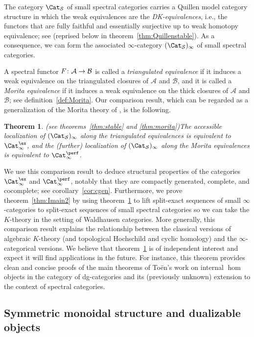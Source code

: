 \documentclass{amsart}
\renewcommand{\to}{\mathchoice{\longrightarrow}{\rightarrow}{\rightarrow}{\rightarrow}}
\let\catsymbfont\mathcal
\newcommand{\aA}{{\catsymbfont{A}}}
\newcommand{\aB}{{\catsymbfont{B}}}
\newcommand{\stabcat}{\Cat_\i^{\ex}}
\newcommand{\idemstabcat}{\Cat_\i^{\perf}}
\newcommand{\Spcat}{\Cat_\mathcal{S}}%
\renewcommand{\i}{\infty}
\numberwithin{equation}{section}
\newtheorem{theorem}[equation]{Theorem}
\theoremstyle{definition}
\begin{document}
The category $\Spcat$ of small spectral categories
carries a Quillen model category structure in which the weak
equivalences are the {\em DK-equivalences}, i.e., the functors that
are fully faithful and essentially surjective up to weak homotopy
equivalence; see \cite{Spectral} (reprised below in
theorem~\ref{thm:Quillenstable}).  As a consequence, we can form the
associated $\i$-category $(\Spcat)_{\i}$ of small spectral
categories.

A spectral functor $F\colon \aA \to \aB$ is called a {\em triangulated
equivalence} if it induces a weak equivalence on the triangulated
closures of $\aA$ and $\aB$, and it is called a {\em Morita
equivalence} if it induces a weak equivalence on the thick closures of
$\aA$ and $\aB$; see definition~\ref{def:Morita}.  Our comparison
result, which can be regarded as a generalization of the
Morita theory of \cite{SS}, is the following.

\begin{theorem}{(see theorems~\ref{thm:stable} and
    \ref{thm:morita})}\label{thm:models}
The accessible localization of $(\Spcat)_{\i}$ along the triangulated equivalences
is equivalent to $\stabcat$, and the (further) localization of
$(\Spcat)_{\i}$ along the Morita equivalences is equivalent to
$\idemstabcat$.
\end{theorem}

We use this comparison result to deduce structural properties of the
categories $\stabcat$ and $\idemstabcat$, notably that they are compactly
generated, complete, and cocomplete; see corollary~\ref{cor:cgen}.
Furthermore, we prove theorem~\ref{thm:Imain2} by using
theorem~\ref{thm:models} to lift split-exact sequences of small
$\i$-categories to split-exact sequences of small spectral categories
so we can take the $K$-theory in the setting of
Waldhausen categories.  More generally, this comparison result
explains the relationship between the classical versions of algebraic
$K$-theory (and topological Hochschild and cyclic homology) and the
$\i$-categorical versions.
We believe that theorem~\ref{thm:models} is of independent interest
and expect it will find applications in the future.  For
instance, this theorem provides clean and concise proofs of the
main theorems of To{\"e}n's work \cite{Toen} on internal $\hom$
objects in the category of dg-categories and its (previously
unknown) extension to the context of spectral categories.

\subsection{Symmetric monoidal structure and dualizable objects}
\end{document}
